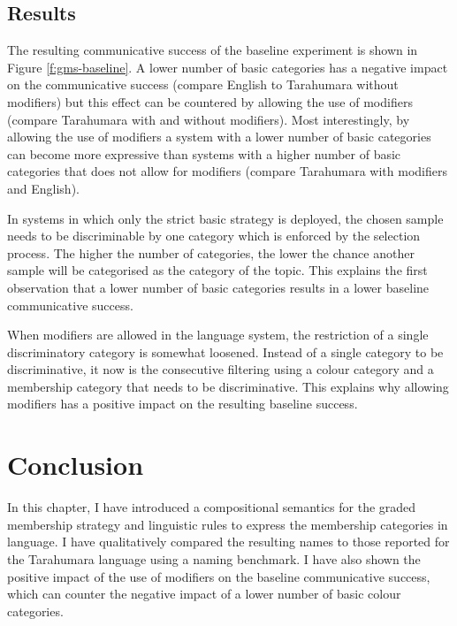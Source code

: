 \subsection{Results}
\label{s:gms-baseline-results}

The resulting communicative success of the baseline experiment is
shown in Figure \ref{f:gms-baseline}. A lower number of basic
categories has a negative impact on the communicative success (compare
English to Tarahumara without modifiers) but this effect can be
countered by allowing the use of modifiers (compare Tarahumara with
and without modifiers). Most interestingly, by allowing the use of
modifiers a system with a lower number of basic categories can become
more expressive than systems with a higher number of basic categories
that does not allow for modifiers (compare Tarahumara with modifiers
and English).

In systems in which only the strict basic strategy is deployed, the
chosen sample needs to be discriminable by one category which is
enforced by the selection process. The higher the number of
categories, the lower the chance another sample will be categorised as
the category of the topic. This explains the first observation that a
lower number of basic categories results in a lower baseline
communicative success.

When modifiers are allowed in the language system, the restriction of
a single discriminatory category is somewhat loosened. Instead of a
single category to be discriminative, it now is the consecutive
filtering using a colour category and a membership category that needs
to be discriminative. This explains why allowing modifiers has a
positive impact on the resulting baseline success.


\section{Conclusion}

In this chapter, I have introduced a compositional semantics for the
graded membership strategy and linguistic rules to express the
membership categories in language. I have qualitatively compared the
resulting names to those reported for the Tarahumara language using a
naming benchmark. I have also shown the positive impact of the use of
modifiers on the baseline communicative success, which can counter the
negative impact of a lower number of basic colour categories.